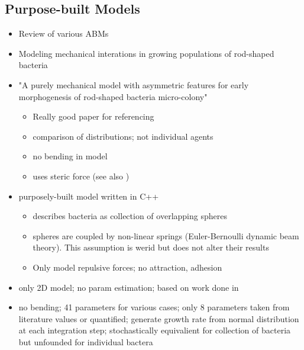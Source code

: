 \documentclass{article}
\begin{document}
\subsection{Purpose-built Models}
\begin{itemize}
    \item \cite{Abar2017} Review of various ABMs
    \item \cite{Winkle2017} Modeling mechanical interations in growing populations of rod-shaped
        bacteria
    \item \cite{Doumic2020} "A purely mechanical model with asymmetric features for early
        morphogenesis of rod-shaped bacteria micro-colony"
    \begin{itemize}
        \item Really good paper for referencing
        \item comparison of distributions; not individual agents
        \item no bending in model
        \item uses steric force (see also \cite{Trejo2013})
    \end{itemize}
    \item \cite{Grant2014} purposely-built model written in C++
    \begin{itemize}
        \item describes bacteria as collection of overlapping spheres
        \item spheres are coupled by non-linear springs (Euler-Bernoulli dynamic beam theory). This
            assumption is werid but does not alter their results
        \item Only model repulsive forces; no attraction, adhesion
    \end{itemize}
    \item \cite{Cho2007} only 2D model; no param estimation; based on work done in \cite{Jnsson2005}
    \item \cite{Storck2014} no bending; 41 parameters for various cases; only 8 parameters taken
        from literature values or quantified; generate growth rate from normal distribution at each
        integration step; stochastically equivalient for collection of bacteria but unfounded for
        individual bactera
\end{itemize}

\end{document}
